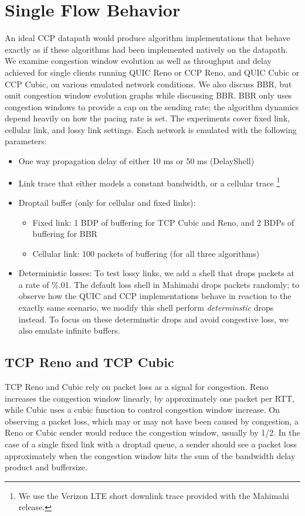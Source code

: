 \section{Single Flow Behavior}
\label{sec:performance:single_flow}
An ideal CCP datapath would produce algorithm implementations that behave exactly as if these algorithms had been implemented natively on the datapath.
We examine congestion window evolution as well as throughput and delay achieved for single clients running QUIC Reno or CCP Reno, and QUIC Cubic or CCP Cubic, on various emulated network conditions.
We also discuss BBR, but omit congestion window evolution graphs while discussing BBR.
BBR only uses congestion windows to provide a cap on the sending rate; the algorithm dynamics depend heavily on how the pacing rate is set.
The experiments cover fixed link, cellular link, and lossy link settings.
Each network is emulated with the following parameters:
\begin{itemize}
    \item One way propagation delay of either 10 ms or 50 ms (DelayShell)
    \item Link trace that either models a constant bandwidth, or a cellular trace \footnote{We use the Verizon LTE short downlink trace provided with the Mahimahi release.}
    \item Droptail buffer (only for cellular and fixed links):
        \begin{itemize}
            \item Fixed link: 1 BDP of buffering for TCP Cubic and Reno, and 2 BDPs of buffering for BBR
            \item Cellular link: 100 packets of buffering (for all three algorithms)
        \end{itemize}
    \item Deterministic losses: To test lossy links, we add a shell that drops packets at a rate of \%.01. The default loss shell in Mahimahi drops packets randomly; to observe how the QUIC and CCP implementations behave in reaction to the exactly same scenario, we modify this shell perform \textit{determinstic} drops instead. To focus on these determinstic drops and avoid congestive loss, we also emulate infinite buffers.
\end{itemize}

\subsection{TCP Reno and TCP Cubic}
\label{sec:performance:single_flow:cubic-reno}



TCP Reno and Cubic rely on packet loss as a signal for congestion.
Reno increases the congestion window linearly, by approximately one packet per RTT, while Cubic uses a cubic function to control congestion window increase.
On observing a packet loss, which may or may not have been caused by congestion, a Reno or Cubic sender would reduce the congestion window, usually by 1/2.
In the case of a single fixed link with a droptail queue, a sender should see a packet loss approximately when the congestion window hits the sum of the bandwidth delay product and buffersize.

